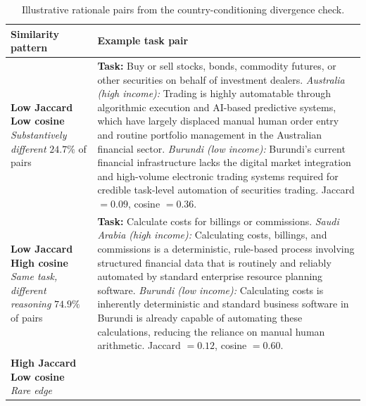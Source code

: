 \documentclass[11pt]{article}
\begin{document}
\begin{table}[!p]
\centering
\scriptsize
\caption{Illustrative rationale pairs from the country-conditioning divergence check.}
\label{tab:validation_quadrant_examples}
\begin{tabular}{L{3.0cm} L{11.5cm}}
\toprule
Similarity pattern & Example task pair \\
\midrule
\textbf{Low Jaccard} \newline
\textbf{Low cosine} \newline
\textit{Substantively different} \newline
$24.7\%$ of pairs &
\textbf{Task:} Buy or sell stocks, bonds, commodity futures, or other securities on behalf of investment dealers. \newline
\textit{Australia (high income):} Trading is highly automatable through algorithmic execution and AI-based predictive systems, which have largely displaced manual human order entry and routine portfolio management in the Australian financial sector. \newline
\textit{Burundi (low income):} Burundi's current financial infrastructure lacks the digital market integration and high-volume electronic trading systems required for credible task-level automation of securities trading. \newline
Jaccard $=0.09$, cosine $=0.36$. \\
\midrule
\textbf{Low Jaccard} \newline
\textbf{High cosine} \newline
\textit{Same task, different reasoning} \newline
$74.9\%$ of pairs &
\textbf{Task:} Calculate costs for billings or commissions. \newline
\textit{Saudi Arabia (high income):} Calculating costs, billings, and commissions is a deterministic, rule-based process involving structured financial data that is routinely and reliably automated by standard enterprise resource planning software. \newline
\textit{Burundi (low income):} Calculating costs is inherently deterministic and standard business software in Burundi is already capable of automating these calculations, reducing the reliance on manual human arithmetic. \newline
Jaccard $=0.12$, cosine $=0.60$. \\
\midrule
\textbf{High Jaccard} \newline
\textbf{Low cosine} \newline
\textit{Rare edge} \newline

\end{tabular}
\end{table}
\end{document}
